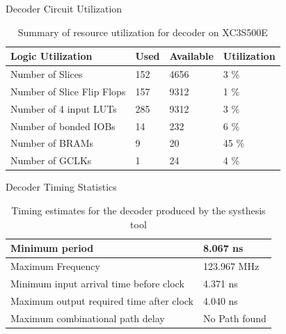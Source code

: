 \documentclass[10pt, compress]{beamer}
\begin{document}
\begin{frame}{Decoder Circuit Utilization}

    \begin{table}[h]
\begin{tabular}{llll}
\toprule
Logic Utilization          & Used & Available & Utilization \\ 
\midrule
Number of Slices           & 152   & 4656      & 3 \%        \\ 
Number of Slice Flip Flops & 157  & 9312      & 1 \%        \\ 
Number of 4 input LUTs     & 285  & 9312      & 3 \%        \\ 
Number of bonded IOBs      & 14   & 232       & 6 \%        \\ 
Number of BRAMs            & 9   & 20        & 45 \%       \\ 
Number of GCLKs            & 1    & 24        & 4 \%        \\ 
\bottomrule
\end{tabular}
\caption{Summary of resource utilization for decoder on XC3S500E}
\end{table}

\end{frame}

\begin{frame}{Decoder Timing Statistics}

\begin{table}[h]
\begin{tabular}{|l|l|}
\hline
Minimum period                           & 8.067 ns      \\ \hline
Maximum Frequency                        & 123.967 MHz   \\ \hline
Minimum input arrival time before clock  & 4.371 ns      \\ \hline
Maximum output required time after clock & 4.040 ns      \\ \hline
Maximum combinational path delay         & No Path found \\ \hline
\end{tabular}
\caption{Timing estimates for the decoder produced by the systhesis tool}
\label{table:time_estimate_decoder}
\end{table}

\end{frame}
\end{document}
